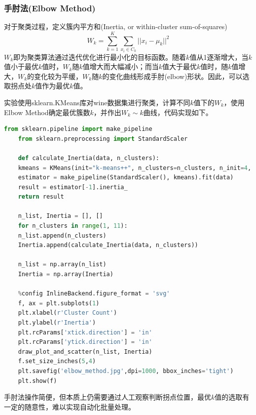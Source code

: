 \documentclass[12pt]{article}
\begin{document}
\subsubsection{手肘法(Elbow Method)}
对于聚类过程，定义簇内平方和(Inertia, or within-cluster sum-of-squares)
$$
W_{k}=\sum_{k=1}^{K} \sum_{x_{i}\in C_{k}} ||x_{i}-\mu_{k}||^{2}
$$
$W_{k}$即为聚类算法通过迭代优化进行最小化的目标函数。随着$k$值从1逐渐增大，当$k$值小于最优$k$值时，$W_{k}$随$k$值增大而大幅减小；而当$k$值大于最优$k$值时，随$k$值增大，$W_{k}$的变化较为平缓，$W_{k}$随$k$的变化曲线形成手肘(elbow)形状。因此，可以选取拐点处$k$值作为最优$k$值。\par
实验使用sklearn.KMeans库对wine数据集进行聚类，计算不同$k$值下的$W_{k}$，使用Elbow Method确定最优簇数$k$，并作出$W_{k}\sim k$曲线，代码实现如下。
\begin{lstlisting}[language=python]
	from sklearn.pipeline import make_pipeline
	from sklearn.preprocessing import StandardScaler
	
	def calculate_Inertia(data, n_clusters):
	kmeans = KMeans(init="k-means++", n_clusters=n_clusters, n_init=4, random_state=0)
	estimator = make_pipeline(StandardScaler(), kmeans).fit(data)
	result = estimator[-1].inertia_
	return result
	
	n_list, Inertia = [], []
	for n_clusters in range(1, 11):
	n_list.append(n_clusters)
	Inertia.append(calculate_Inertia(data, n_clusters))
	
	n_list = np.array(n_list)
	Inertia = np.array(Inertia)
	
	%config InlineBackend.figure_format = 'svg'
	f, ax = plt.subplots(1)
	plt.xlabel(r'Cluster Count')
	plt.ylabel(r'Inertia')
	plt.rcParams['xtick.direction'] = 'in'
	plt.rcParams['ytick.direction'] = 'in'
	draw_plot_and_scatter(n_list, Inertia)
	f.set_size_inches(5,4)
	plt.savefig('elbow_method.jpg',dpi=1000, bbox_inches='tight')
	plt.show(f)
\end{lstlisting}
	\par 
	手肘法操作简便，但本质上仍需要通过人工观察判断拐点位置，最优$k$值的选取有一定的随意性，难以实现自动化批量处理。
\end{document}
